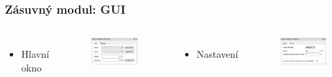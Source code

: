 \documentclass{beamer}
\begin{document}
\begin{frame}
\frametitle{Zásuvný modul: GUI}
\begin{columns}
	\begin{itemize}
		\item Hlavní okno
	\end{itemize}
\begin{figure}[H] \centering
		\includegraphics[scale=0.55]{./pictures/gui_main.png}
\end{figure}

	\begin{itemize}
		\item Nastavení
	\end{itemize}
\begin{figure}[H] \centering
		\includegraphics[scale=0.55]{./pictures/gui_settings.png}
\end{figure}
\end{columns}


\end{frame}
\end{document}
